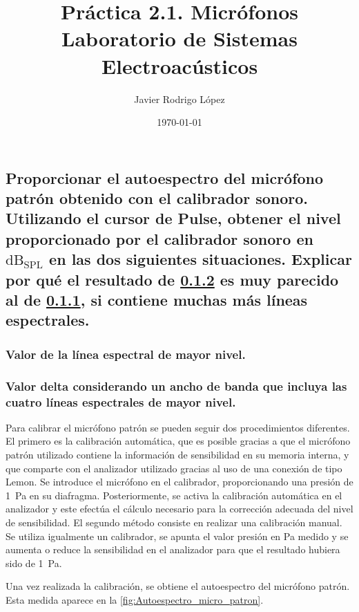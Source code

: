\documentclass[10pt]{article}
\title{\Huge Práctica 2.1. Micrófonos \\\huge Laboratorio de Sistemas Electroacústicos}
\author{Javier Rodrigo López}
\date{\today}
\begin{document}
\maketitle

\subsection{Proporcionar el autoespectro del micrófono patrón obtenido con el calibrador sonoro. Utilizando el cursor de Pulse, obtener el nivel proporcionado por el calibrador sonoro en $\unit{\dB_{\text{SPL}}}$ en las dos siguientes situaciones. Explicar por qué el resultado de \ref{sec:segundo} es muy parecido al de \ref{sec:primero}, si contiene muchas más líneas espectrales.}
\subsubsection{Valor de la línea espectral de mayor nivel.} \label{sec:primero}
\subsubsection{Valor delta considerando un ancho de banda que incluya las cuatro líneas espectrales de mayor nivel.} \label{sec:segundo}

Para calibrar el micrófono patrón se pueden seguir dos procedimientos diferentes. El primero es la calibración automática, que es posible gracias a que el micrófono patrón utilizado contiene la información de sensibilidad en su memoria interna, y que comparte con el analizador utilizado gracias al uso de una conexión de tipo Lemon. Se introduce el micrófono en el calibrador, proporcionando una presión de \qty{1}{\pascal } en su diafragma. Posteriormente, se activa la calibración automática en el analizador y este efectúa el cálculo necesario para la corrección adecuada del nivel de sensibilidad. El segundo método consiste en realizar una calibración manual. Se utiliza igualmente un calibrador, se apunta el valor presión en \unit{\pascal } medido y se aumenta o reduce la sensibilidad en el analizador para que el resultado hubiera sido de \qty{1}{\pascal }.

Una vez realizada la calibración, se obtiene el autoespectro del micrófono patrón. Esta medida aparece en la \autoref{fig:Autoespectro_micro_patron}.
\end{document}
